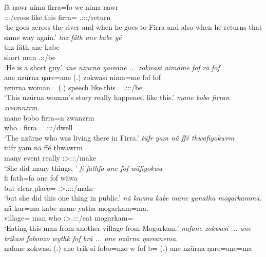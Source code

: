 \begin{exe}
	\gll fä ŋawr nima firra=fo  we nima ŋawr\\
	{\Dist} \Stsg:\Sbj:\Nonpast:\Ipfv/cross {like.this} firra={\All} \Tsg.\Masc:\Sbj:\Nonpast:\Ipfv/return\\
	\trans `he goes across the river and when he goes to Firra and also when he returns that same way again.'
	\emph{tnz fäth ane kabe yé}\\
	\gll tnz fäth ane kabe \\
	short \Dim{} {\Dem} man \Tsg.\Masc:\Nonpast:\Ipfv/be\\
	\trans `He is a short guy.'
	\emph{ane nzürna ŋareane ... zokwasi nimame fof rä fof}\\
	\gll ane nzürna ŋare=ane (.) zokwasi nima=me fof  fof\\
	{\Dem} nzürna woman={\Poss} (.) speech like.this={\Ins} {\Emph} \Tsg.\F:\Sbj:\Nonpast:\Ipfv/be {\Emph}\\
	\trans `This nzürna woman's story really happened like this.'
	\emph{mane bobo firran zwamnzrm.}\\
	\gll mane bobo firra=n zwanzrm\\
	who \Med.{\All} firra={\Loc} \Tsg.\F:\Sbj:\Pst:\Dur/dwell\\
	\trans `The nzürne who was living there in Firra.'
	\emph{tüfr yam nä ffé thwafiyokwrm}\\
	\gll tüfr yam nä ffé thwawrm\\
	many event {\Indf} really \Sg:\Sbj>\Stpl:\Obj:\Pst:\Dur/make\\
	\trans `She did many things, '
	\emph{fi fathfa ane fof wäfiyokwa}\\
	\gll fi fath=fa ane fof wäwa\\
	but clear.place={\Abl} {\Dem} {\Emph} \Sg:\Sbj>\Tsg.\F:\Obj:\Pst:\Ipfv/make\\
	\trans `but she did this one thing in public.'
	\emph{nä karma kabe mane yanatha mogarkamma.}\\
	\gll nä kar=ma kabe mane yatha mogarkam=ma.\\
	{\Indf} village={\Char} man who \Sg:\Sbj>\Tsg.\Masc:\Obj:\Pst:\Ipfv/eat mogarkam=\Char\\
	\trans `Eating this man from another village from Mogarkam.'
	\emph{nafane zokwasi ... ane trikasi fobonzo wythk fof brä ... ane nzürna ŋareanema.}\\
	\gll nafane zokwasi (.) ane trik-si fobo=nzo w fof b= (.) ane nzürna ŋare=ane=ma\\

\end{exe}
